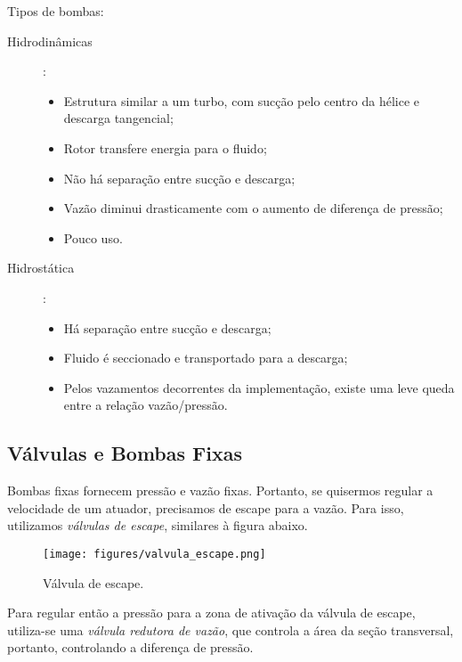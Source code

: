 Tipos de bombas:
\begin{description}
    \item[Hidrodinâmicas] :
	\begin{itemize}
	    \item Estrutura similar a um turbo, com sucção pelo centro da hélice e descarga tangencial;
	    \item Rotor transfere energia para o fluido;
	    \item Não há separação entre sucção e descarga;
	    \item Vazão diminui drasticamente com o aumento de diferença de pressão;
	    \item Pouco uso.
	\end{itemize}
    \item[Hidrostática]:
	\begin{itemize}
	    \item Há separação entre sucção e descarga;
	    \item Fluido é seccionado e transportado para a descarga;
	    \item Pelos vazamentos decorrentes da implementação, existe uma leve queda entre a relação vazão/pressão.
	\end{itemize}
\end{description}

\subsection*{Válvulas e Bombas Fixas}

Bombas fixas fornecem pressão e vazão fixas. Portanto, se quisermos regular a velocidade de um atuador, precisamos de escape para a vazão. Para isso, utilizamos \emph{válvulas de escape}, similares à figura abaixo.

\begin{figure}[H]
    \centering
    \texttt{[image: figures/valvula\_escape.png]}
    \caption{Válvula de escape.}
    \label{fig:figures-valvula_escape-png}
\end{figure}

Para regular então a pressão para a zona de ativação da válvula de escape, utiliza-se uma \emph{válvula redutora de vazão}, que controla a área da seção transversal, portanto, controlando a diferença de pressão.

